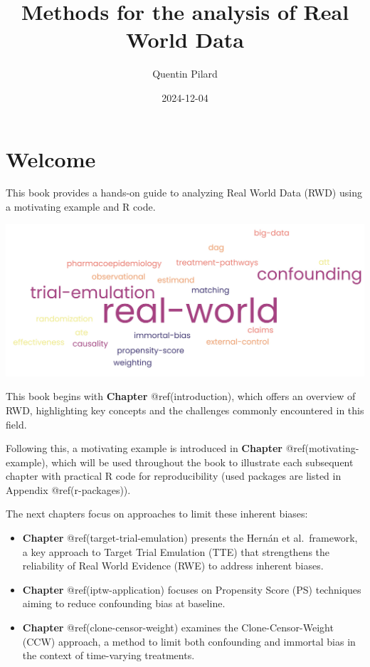 \documentclass[
]{book}
\title{Methods for the analysis of Real World Data}
\author{Quentin Pilard}
\date{2024-12-04}
\begin{document}
\frontmatter
\maketitle

{
\setcounter{tocdepth}{1}
\tableofcontents
}
\mainmatter
\chapter*{Welcome}\label{welcome}

This book provides a hands-on guide to analyzing Real World Data (RWD)
using a motivating example and R code.

\begin{center}\includegraphics[width=0.8\linewidth]{images/cloudword} \end{center}

This book begins with \textbf{Chapter} @ref(introduction), which offers
an overview of RWD, highlighting key concepts and the challenges
commonly encountered in this field.

Following this, a motivating example is introduced in \textbf{Chapter}
@ref(motivating-example), which will be used throughout the book to
illustrate each subsequent chapter with practical R code for
reproducibility (used packages are listed in Appendix @ref(r-packages)).

The next chapters focus on approaches to limit these inherent biases:

\begin{itemize}
\item
  \textbf{Chapter} @ref(target-trial-emulation) presents the Hernán et
  al.~framework, a key approach to Target Trial Emulation (TTE) that
  strengthens the reliability of Real World Evidence (RWE) to address
  inherent biases.
\item
  \textbf{Chapter} @ref(iptw-application) focuses on Propensity Score
  (PS) techniques aiming to reduce confounding bias at baseline.
\item
  \textbf{Chapter} @ref(clone-censor-weight) examines the
  Clone-Censor-Weight (CCW) approach, a method to limit both confounding
  and immortal bias in the context of time-varying treatments.
\end{itemize}
\end{document}
